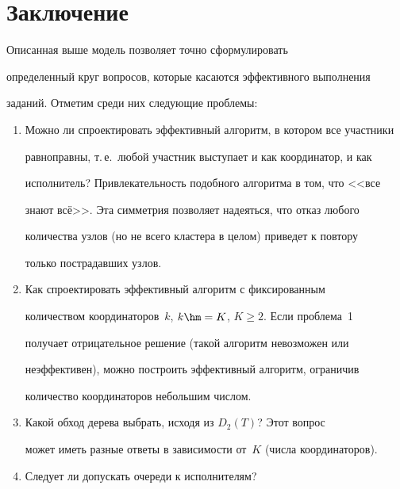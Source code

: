 \section{Заключение}





      Описанная выше модель позволяет точно сформулировать 


определенный круг вопросов, которые касаются эффективного выполнения 


заданий. Отметим среди них следующие проблемы:


      \begin{enumerate}[1.]


\item  Можно ли спроектировать эффективный алгоритм, в котором все участники 


равноправны, т.\,е.\ любой участник выступает и как координатор, и как 


исполнитель? Привлекательность подобного алгоритма в том, что <<все 


знают всё>>. Эта симметрия позволяет надеяться, что отказ любого 


количества узлов (но не всего кластера в целом) приведет к повтору 


только пострадавших узлов.\\[-15pt]


\item  Как спроектировать эффективный алгоритм с фиксированным 


количеством координаторов~$k$, $k\hm=K$, $K\geq 2$.  Если проблема~1 


получает отрицательное решение (такой алгоритм невозможен или 


неэффективен), можно построить эффективный алгоритм, ограничив 


количество координаторов небольшим числом. \\[-15pt]


\item  Какой обход дерева выбрать, исходя из $D_2(T)$? Этот вопрос 


может иметь разные ответы в зависимости от~$K$ (числа координаторов). \\[-15pt]


\item Следует ли допускать очереди к исполнителям? 


\end{enumerate}





